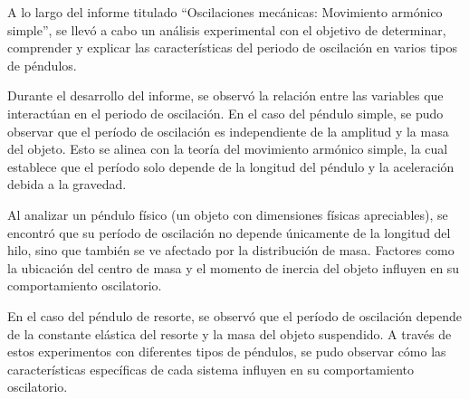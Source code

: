 \documentclass[twocolumn, 12pt]{article}
\begin{document}
A lo largo del informe titulado ``Oscilaciones mecánicas:
Movimiento armónico simple'', se llevó a cabo un análisis
experimental con el objetivo de determinar, comprender y
explicar las características del periodo de oscilación en
varios tipos de péndulos.

Durante el desarrollo del informe, se observó la relación
entre las variables que interactúan en el periodo de
oscilación. En el caso del péndulo simple, se pudo observar
que el período de oscilación es independiente de la
amplitud y la masa del objeto. Esto se alinea con la teoría
del movimiento armónico simple, la cual establece que el
período solo depende de la longitud del péndulo y la
aceleración debida a la gravedad.

Al analizar un péndulo físico (un objeto con dimensiones
físicas apreciables), se encontró que su período de
oscilación no depende únicamente de la longitud del hilo,
sino que también se ve afectado por la distribución de
masa. Factores como la ubicación del centro de masa y el
momento de inercia del objeto influyen en su comportamiento
oscilatorio.

En el caso del péndulo de resorte, se observó que el
período de oscilación depende de la constante elástica del
resorte y la masa del objeto suspendido. A través de estos
experimentos con diferentes tipos de péndulos, se pudo
observar cómo las características específicas de cada
sistema influyen en su comportamiento oscilatorio.

\nocite{comprobacion-experimental}

\printbibliography
\end{document}
